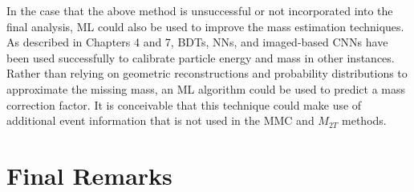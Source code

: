 In the case that the above method is unsuccessful or not incorporated into the final analysis, ML could also be used to improve the mass estimation techniques. As described in Chapters 4 and 7, BDTs, NNs, and imaged-based CNNs have been used successfully to calibrate particle energy and mass in other instances. Rather than relying on geometric reconstructions and probability distributions to approximate the missing mass, an ML algorithm could be used to predict a mass correction factor. It is conceivable that this technique could make use of additional event information that is not used in the MMC and $M_{2T}$ methods.

\section{Final Remarks}

